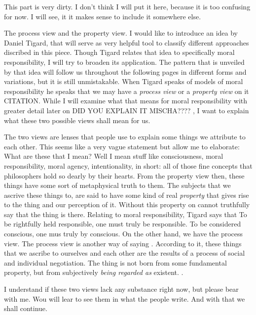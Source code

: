 \documentclass{article}
\begin{document}
This part is very dirty. I don't think I will put it here, because it is too
confusing for now. I will see, it it makes sense to include it somewhere else.



The process view and the property view.
I would like to introduce an idea by Daniel Tigard, that will serve as very
helpful tool to classify different approaches discribed in this piece. Though
Tigard relates that idea to specifically moral responsibility, I will try to
broaden its application. The pattern that is unveiled by that idea will follow
us throughout the following pages in different forms and variations, but it is
still unmistakable. When Tigard speaks of models of moral responsibility he
speaks that we may have a \textit{process view} or a \textit{property view} on
it CITATION. While I will examine what that means for moral responsibility with greater
detail later on
DID YOU EXPLAIN IT MISCHA????
, I want to explain what these two possible views shall mean for us.

The two views are lenses that people use to explain some things we attribute to
each other. This seems like a very vague statement but allow me to elaborate:
What are these  that I mean? Well I mean stuff like consciousness,
moral responsibility, moral agency, intentionality, in short: all of those fine
concepts that philosophers hold so dearly by their hearts. From the property
view then, these things have some sort of metaphysical truth to them. The
subjects that we ascrive these things to, are said to have some kind of real
\textit{property} that gives rise to the thing and our perception of it. Without
this property on cannot truthfully say that the thing is there. Relating to
moral responsibility, Tigard says that 
To be rightfully held responsible, one must truly be responsible. To be
considered conscious, one mus truly by conscious. On the other hand, we have the
process view. The process view is another way of saying . According to it, these things that we ascribe to ourselves and each
other are the results of a process of social and individual negotiation. The
thing is not born from some fundamental property, but from subjectively
\textit{being regarded as} existent. .

I understand if these two views lack any substance right now, but please bear
with me. Wou will lear to see them in what the people write. And with that we
shall continue.
\end{document}
